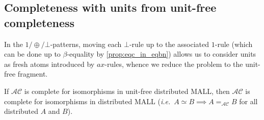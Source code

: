 \documentclass{lmcs}
\newcommand*{\ie}{\emph{i.e.}}
\newcommand*{\iso}{\mathrel{\simeq}} %
\newcommand*{\AC}{\mathcal{AC}} %
\newcommand*{\eqeq}{=} %
\newcommand*{\eqAC}{\eqeq_\AC} %
\begin{document}
\subsection{Completeness with units from unit-free completeness}
\label{subsec:compl_units}

In the $1/\oplus/\bot$-patterns, moving each $\bot$-rule up to the associated $1$-rule (which can be done up to $\beta$-equality by \autoref{prop:eqc_in_eqbn}) allows us to consider units as fresh atoms introduced by $ax$-rules, whence we reduce the problem to the unit-free fragment.

\begin{thm}
\label{th:iso_complet_mall}
If $\AC$ is complete for isomorphisms in unit-free distributed MALL, then $\AC$ is complete for isomorphisms in distributed MALL (\ie\ $A\iso B \implies A\eqAC B$ for all distributed $A$ and $B$).
\end{thm}
\end{document}
